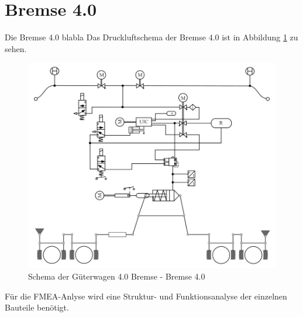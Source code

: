 \section{Bremse 4.0}
Die Bremse 4.0 blabla 
Das Druckluftschema der Bremse 4.0 ist in Abbildung \ref{fig:GW40Schema} zu sehen.\par
\begin{figure}[hbt]
    \centering
    \includegraphics[width=\textwidth]{Bilder/GW40Schema.png}
    \caption{Schema der Güterwagen 4.0 Bremse - Bremse 4.0}
    \label{fig:GW40Schema}
\end{figure}
Für die FMEA-Anlyse wird eine Struktur- und Funktionsanalyse der einzelnen Bauteile benötigt. 

